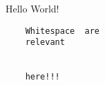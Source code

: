 \documentclass{scrartcl}
\begin{document}
    Hello World!

    \begin{verbatim}
    Whitespace  are
    relevant


    here!!!
    \end{verbatim}
\end{document}
